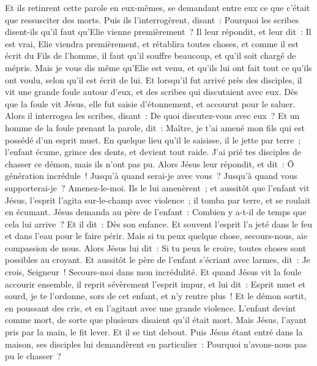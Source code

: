 \begin{multicols}{2}
Et ils retinrent cette parole en eux-mêmes, se demandant entre eux ce que c'était que ressusciter des morts.
Puis ils l'interrogèrent, disant~: Pourquoi les scribes disent-ils qu'il faut qu'Elie vienne premièrement~?
Il leur répondit, et leur dit~: Il est vrai, Elie viendra premièrement, et rétablira toutes choses, et comme il est écrit du Fils de l'homme, il faut qu'il souffre beaucoup, et qu'il soit chargé de mépris.
Mais je vous dis même qu'Elie est venu, et qu'ils lui ont fait tout ce qu'ils ont voulu, selon qu'il est écrit de lui.
Et lorsqu'il fut arrivé près des disciples, il vit une grande foule autour d'eux, et des scribes qui discutaient avec eux.
Dès que la foule vit Jésus, elle fut saisie d'étonnement, et accourut pour le saluer.
Alors il interrogea les scribes, disant~: De quoi discutez-vous avec eux~?
Et un homme de la foule prenant la parole, dit~: Maître, je t'ai amené mon fils qui est possédé d'un esprit muet.
En quelque lieu qu'il le saisisse, il le jette par terre~; l'enfant écume, grince des dents, et devient tout raide. J'ai prié tes disciples de chasser ce démon, mais ils n'ont pas pu.
Alors Jésus leur répondit, et dit~: Ô génération incrédule~! Jusqu'à quand serai-je avec vous~? Jusqu'à quand vous supporterai-je~? Amenez-le-moi. Ils le lui amenèrent~;
et aussitôt que l'enfant vit Jésus, l'esprit l'agita sur-le-champ avec violence~; il tomba par terre, et se roulait en écumant.
Jésus demanda au père de l'enfant~: Combien y a-t-il de temps que cela lui arrive~? Et il dit~: Dès son enfance.
Et souvent l'esprit l'a jeté dans le feu et dans l'eau pour le faire périr. Mais si tu peux quelque chose, secours-nous, aie compassion de nous.
Alors Jésus lui dit~: Si tu peux le croire, toutes choses sont possibles au croyant.
Et aussitôt le père de l'enfant s'écriant avec larmes, dit~: Je crois, Seigneur~! Secours-moi dans mon incrédulité.
Et quand Jésus vit la foule accourir ensemble, il reprit sévèrement l'esprit impur, et lui dit~: Esprit muet et sourd, je te l'ordonne, sors de cet enfant, et n'y rentre plus~!
Et le démon sortit, en poussant des cris, et en l'agitant avec une grande violence. L'enfant devint comme mort, de sorte que plusieurs disaient qu'il était mort.
Mais Jésus, l'ayant pris par la main, le fit lever. Et il se tint debout.
Puis Jésus étant entré dans la maison, ses disciples lui demandèrent en particulier~: Pourquoi n'avons-nous pas pu le chasser~?

\end{multicols}
